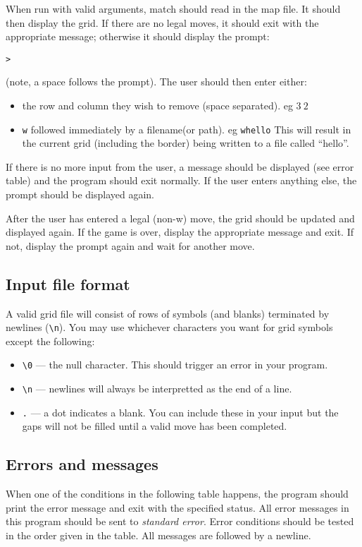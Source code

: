 When run with valid arguments, match should read in the map file.
It should then display the grid.
If there are no legal moves, it should exit with the appropriate message; otherwise it should display the prompt:
\begin{verbatim}
>
\end{verbatim}
(note, a space follows the prompt).
The user should then enter either:
\begin{itemize}
 \item the row and column they wish to remove (space separated). eg $3\:2$
 \item \texttt{w} followed immediately by a filename(or path). eg \texttt{whello}
 This will result in the current grid (including the border) being written to a file called ``hello''.
\end{itemize}
If there is no more input from the user, a message should be displayed (see error table) and
the program should exit normally.
If the user enters anything else, the prompt should be displayed again.

After the user has entered a legal (non-w) move, the grid should be updated and displayed again.
If the game is over, display the appropriate message and exit.
If not, display the prompt again and wait for another move.

\subsection{Input file format}
A valid grid file will consist of rows of symbols (and blanks) terminated by newlines (\verb|\n|).
You may use whichever characters you want for grid symbols except the following:
\begin{itemize}
 \item \verb|\0|          --- the null character. This should trigger an error in your program.
 \item \verb|\n|   --- newlines will always be interpretted as the end of a line.
 \item \verb|.| --- a dot indicates a blank. You can include these in your input but the gaps will not be filled until
 a valid move has been completed.
\end{itemize}

\subsection{Errors and messages}\label{sec:errs}
When one of the conditions in the following table happens, the program should print the error message and exit with
the specified status.
All error messages in this program should be sent to \emph{standard error}.
Error conditions should be tested in the order given in the table.
All messages are followed by a newline.


